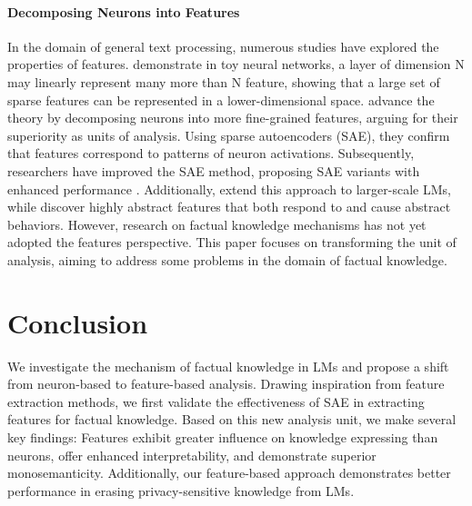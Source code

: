 \paragraph{Decomposing Neurons into Features}
In the domain of general text processing, numerous studies have explored the properties of features. 
\citet{elhage2022superposition} demonstrate in toy neural networks, a layer of dimension N may linearly represent many more than N feature, showing that a large set of sparse features can be represented in a lower-dimensional space.
\citet{bricken2023monosemanticity} advance the theory by decomposing neurons into more fine-grained features, arguing for their superiority as units of analysis. Using sparse autoencoders (SAE), they confirm that features correspond to patterns of neuron activations. Subsequently, researchers have improved the SAE method, proposing SAE variants with enhanced performance \citep{rajamanoharan2024improving,gao2024scaling}. Additionally, \citet{huben2024sparse} extend this approach to larger-scale LMs, while \citet{templeton2024scaling} discover highly abstract features that both respond to and cause abstract behaviors.
However, research on factual knowledge mechanisms has not yet adopted the features perspective. This paper focuses on transforming the unit of analysis, aiming to address some problems in the domain of factual knowledge.

\vspace{-3mm}
\section{Conclusion}
We investigate the mechanism of factual knowledge in LMs and propose a shift from neuron-based to feature-based analysis. Drawing inspiration from feature extraction methods, we first validate the effectiveness of SAE in extracting features for factual knowledge. Based on this new analysis unit, we make several key findings: Features exhibit greater influence on knowledge expressing than neurons, offer enhanced interpretability, and demonstrate superior monosemanticity. Additionally, our feature-based approach demonstrates better performance in erasing privacy-sensitive knowledge from LMs.

